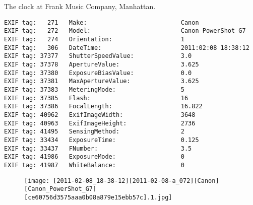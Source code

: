 \section{\protect{}}
\noindent The clock at Frank Music Company, Manhattan.
\noindent
\begin{lstlisting}
EXIF tag:   271   Make:                          Canon
EXIF tag:   272   Model:                         Canon PowerShot G7
EXIF tag:   274   Orientation:                   1
EXIF tag:   306   DateTime:                      2011:02:08 18:38:12
EXIF tag: 37377   ShutterSpeedValue:             3.0
EXIF tag: 37378   ApertureValue:                 3.625
EXIF tag: 37380   ExposureBiasValue:             0.0
EXIF tag: 37381   MaxApertureValue:              3.625
EXIF tag: 37383   MeteringMode:                  5
EXIF tag: 37385   Flash:                         16
EXIF tag: 37386   FocalLength:                   16.822
EXIF tag: 40962   ExifImageWidth:                3648
EXIF tag: 40963   ExifImageHeight:               2736
EXIF tag: 41495   SensingMethod:                 2
EXIF tag: 33434   ExposureTime:                  0.125
EXIF tag: 33437   FNumber:                       3.5
EXIF tag: 41986   ExposureMode:                  0
EXIF tag: 41987   WhiteBalance:                  0

\end{lstlisting}
\clearpage
\begin{figure}
\raggedleft
\texttt{[image: [2011-02-08\_18-38-12][2011-02-08-a\_072][Canon][Canon\_PowerShot\_G7][ce60756d3575aaa0b08a879e15ebb57c].1.jpg]}
\end{figure}


\clearpage
